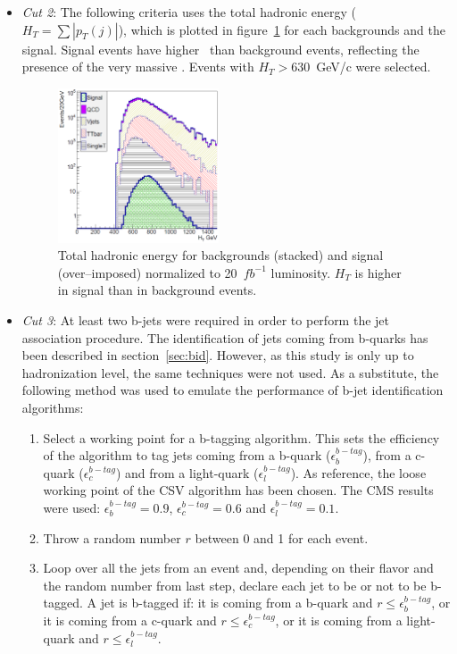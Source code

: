 \begin{itemize}
\item \textit{Cut 2}: The following criteria uses the total hadronic energy ($H_{T}=\sum |p_{T}(j)|$), which is plotted in figure~\ref{fig:Var2} for each backgrounds and the signal. Signal events have higher \HT~than background events, reflecting the presence of the very massive \Tp. Events with $H_{T}>630$~GeV/c were selected.

\begin{figure}[!Hhtbp]
  \begin{center}
    \includegraphics[width=0.45\textwidth]{figs/Pheno/HT.png}
    \caption{Total hadronic energy for backgrounds (stacked) and signal (over--imposed) normalized to 20~$fb^{-1}$ luminosity. $H_{T}$ is higher in signal than in background events.}
    \label{fig:Var2}
  \end{center}
\end{figure}

\item \textit{Cut 3}: At least two b-jets were required in order to perform the jet association procedure. The identification of jets coming from b-quarks has been described in section~\ref{sec:bid}. However, as this study is only up to hadronization level, the same techniques were not used. As a substitute, the following method was used to emulate the performance of b-jet identification algorithms:
  \begin{enumerate}
  \item Select a working point for a b-tagging algorithm. This sets the efficiency of the algorithm to tag jets coming from a b-quark ($\epsilon^{b-tag}_{b}$), from a c-quark ($\epsilon^{b-tag}_{c}$) and from a light-quark ($\epsilon^{b-tag}_{l}$). As reference, the loose working point of the CSV algorithm has been chosen. The CMS results~\cite{CMS-PAS-BTV-13-001} were used: $\epsilon^{b-tag}_{b}=0.9$, $\epsilon^{b-tag}_{c}=0.6$ and $\epsilon^{b-tag}_{l}=0.1$. 
  \item Throw a random number $r$ between 0 and 1 for each event.
  \item Loop over all the jets from an event and, depending on their flavor and the random number from last step, declare each jet to be or not to be b-tagged. A jet is b-tagged if: it is coming from a b-quark and $r\leq\epsilon^{b-tag}_{b}$, or it is coming from a c-quark and $r\leq\epsilon^{b-tag}_{c}$, or it is coming from a light-quark and $r\leq\epsilon^{b-tag}_{l}$.
  \end{enumerate}


\end{itemize}
